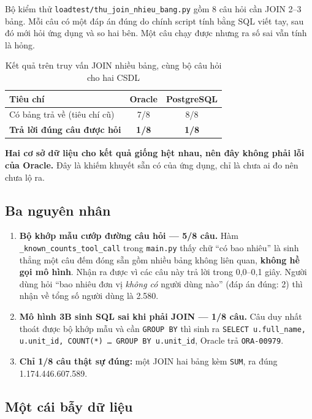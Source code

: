 \documentclass[12pt,a4paper]{article}
\newcommand{\bad}[1]{\textcolor{dangerred}{\bfseries #1}}
\newcommand{\fpath}[1]{\nolinkurl{#1}}
\begin{document}
Bộ kiểm thử \fpath{loadtest/thu_join_nhieu_bang.py} gồm 8 câu hỏi cần JOIN 2--3
bảng. Mỗi câu có một đáp án đúng do chính script tính bằng SQL viết tay, sau đó
mới hỏi ứng dụng và so hai bên. Một câu chạy được nhưng ra số sai vẫn tính là
hỏng.

\begin{table}[H]
\centering
\caption{Kết quả trên truy vấn JOIN nhiều bảng, cùng bộ câu hỏi cho hai CSDL}
\label{tab:join}
\begin{tabular}{@{}L{8.4cm}cc@{}}
\toprule
{}
Tiêu chí & Oracle & PostgreSQL\\
\midrule
Có bảng trả về (tiêu chí cũ) & 7/8 & 8/8\\
\textbf{Trả lời đúng câu được hỏi} & \bad{1/8} & \bad{1/8}\\
\bottomrule
\end{tabular}
\end{table}

\textbf{Hai cơ sở dữ liệu cho kết quả giống hệt nhau, nên đây không phải lỗi
của Oracle.} Đây là khiếm khuyết sẵn có của ứng dụng, chỉ là chưa ai đo nên
chưa lộ ra.

\subsection{Ba nguyên nhân}

\begin{enumerate}
\item \textbf{Bộ khớp mẫu cướp đường câu hỏi --- 5/8 câu.} Hàm
\texttt{\_known\_counts\_tool\_call} trong \texttt{main.py} thấy chữ ``có bao
nhiêu'' là sinh thẳng một câu đếm đóng sẵn gồm nhiều bảng không liên quan,
\textbf{không hề gọi mô hình}. Nhận ra được vì các câu này trả lời trong
0,0--0,1 giây. Người dùng hỏi ``bao nhiêu đơn vị \emph{không có} người dùng
nào'' (đáp án đúng: 2) thì nhận về tổng số người dùng là 2.580.

\item \textbf{Mô hình 3B sinh SQL sai khi phải JOIN --- 1/8 câu.} Câu duy nhất
thoát được bộ khớp mẫu và cần \texttt{GROUP BY} thì sinh ra
\texttt{SELECT u.full\_name, u.unit\_id, COUNT(*) \dots{} GROUP BY u.unit\_id},
Oracle trả \texttt{ORA-00979}.

\item \textbf{Chỉ 1/8 câu thật sự đúng:} một JOIN hai bảng kèm \texttt{SUM},
ra đúng 1.174.446.607.589.
\end{enumerate}

\subsection{Một cái bẫy dữ liệu}
\end{document}
